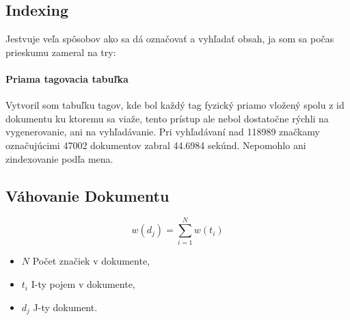 \subsection{Indexing}

Jestvuje veľa spôsobov ako sa dá označovať a vyhľadať obsah, ja som sa počas prieskumu zameral na try:

\paragraph{Priama tagovacia tabuľka}

Vytvoril som tabuľku tagov, kde bol každý tag fyzický priamo vložený spolu z id dokumentu ku ktoremu sa viaže,
tento prístup ale nebol dostatočne rýchli na vygenerovanie, ani na vyhľadávanie. Pri vyhľadávaní nad 118989 značkamy 
označujúcimi 47002 dokumentov zabral 44.6984 sekúnd. Nepomohlo ani zindexovanie podľa mena.

\subsection{Váhovanie Dokumentu}

\[w(d_j) = \sum_{i=1}^{N} w(t_i) \]

\begin{itemize}
\item{\(N\)} Počet značiek v dokumente,
\item{\(t_i\)} I-ty pojem v dokumente,
\item{\(d_j\)} J-ty dokument.
\end{itemize}

